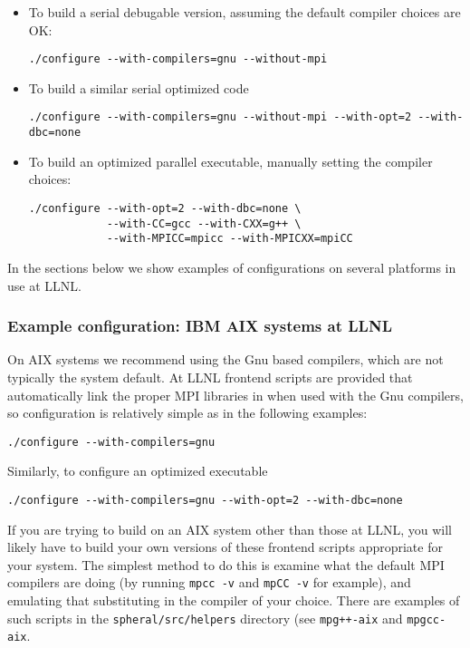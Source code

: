 \documentclass{article}
\begin{document}
\begin{itemize}
\item To build a serial debugable version, assuming the default compiler choices
are OK:
\begin{verbatim}
./configure --with-compilers=gnu --without-mpi
\end{verbatim}

\item To build a similar serial optimized code
\begin{verbatim}
./configure --with-compilers=gnu --without-mpi --with-opt=2 --with-dbc=none
\end{verbatim}

\item To build an optimized parallel executable, manually setting the compiler
choices:
\begin{verbatim}
./configure --with-opt=2 --with-dbc=none \
            --with-CC=gcc --with-CXX=g++ \
            --with-MPICC=mpicc --with-MPICXX=mpiCC
\end{verbatim}

\end{itemize}

In the sections below we show examples of configurations on several platforms in
use at LLNL.



\subsubsection{Example configuration: IBM AIX systems at LLNL}
\label{berg.sec}
On AIX systems we recommend using the Gnu based compilers, which are not
typically the system default.  At LLNL frontend scripts are provided that
automatically link the proper MPI libraries in when used with the Gnu
compilers, so configuration is relatively simple as in the following examples:
\begin{verbatim}
./configure --with-compilers=gnu
\end{verbatim}
Similarly, to configure an optimized executable
\begin{verbatim}
./configure --with-compilers=gnu --with-opt=2 --with-dbc=none
\end{verbatim}

If you are trying to build on an AIX system other than those at LLNL, you will
likely have to build your own versions of these frontend scripts appropriate
for your system.  The simplest method to do this is examine what the default
MPI compilers are doing (by running \verb+mpcc -v+ and \verb+mpCC -v+ for
example), and emulating that substituting in the compiler of your choice.
There are examples of such scripts in the \verb+spheral/src/helpers+ directory
(see \verb.mpg++-aix. and \verb+mpgcc-aix+.
\end{document}

